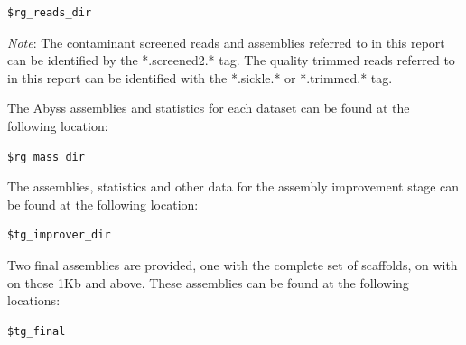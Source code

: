 \documentclass{amsart}
\begin{document}
\begin{lstlisting}[label=path:1]
$rg_reads_dir
\end{lstlisting}

\emph{Note}: The contaminant screened reads and assemblies referred to in this report can be identified by the *.screened2.* tag.  The quality trimmed reads referred to in this report can be identified with the *.sickle.* or *.trimmed.* tag.

The Abyss assemblies and statistics for each dataset can be found at the following location:

\begin{lstlisting}[label=path:1]
$rg_mass_dir
\end{lstlisting}


The assemblies, statistics and other data for the assembly improvement stage can be found at the following location:

\begin{lstlisting}[label=path:1]
$tg_improver_dir
\end{lstlisting} 


Two final assemblies are provided, one with the complete set of scaffolds, on with on those 1Kb and above.  These assemblies can be found at the following locations:

\begin{lstlisting}[label=path:1]
$tg_final
\end{lstlisting} 
\end{document}
